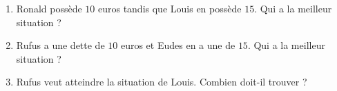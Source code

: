 
\begin{exercice}\label{exo2smath-0044}

    \begin{enumerate}
        \item
            Ronald possède \( 10\) euros tandis que Louis en possède \( 15\). Qui a la meilleur situation ?
        \item
            Rufus a une dette de \( 10\) euros et Eudes en a une de \( 15\). Qui a la meilleur situation ?
        \item
            Rufus veut atteindre la situation de Louis. Combien doit-il trouver ?
    \end{enumerate}

\end{exercice}
